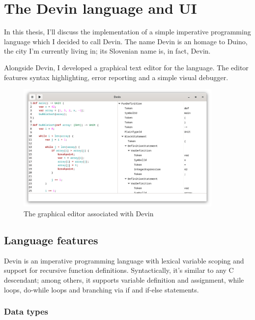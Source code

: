 \documentclass[UdineBachThesis,american,11pt]{PhdThesis}
\begin{document}
  \newpage
  \thispagestyle{empty}

  \chapter{The Devin language and UI}

  In this thesis, I'll discuss the implementation of a simple imperative
  programming language which I decided to call Devin. The name Devin is an
  homage to Duino, the city I'm currently living in; its Slovenian name is, in
  fact, Devin.

  Alongside Devin, I developed a graphical text editor for the language. The
  editor features syntax highlighting, error reporting and a simple visual
  debugger.

  \begin{figure}[H]
    \centering
    \includegraphics[width=0.9\textwidth]{2.png}
    \caption{The graphical editor associated with Devin}
  \end{figure}

  \section{Language features}

  Devin is an imperative programming language with lexical variable scoping and
  support for recursive function definitions. Syntactically, it's similar to any
  C descendant; among others, it supports variable definition and assignment,
  while loops, do-while loops and branching via if and if-else statements.

  \subsection{Data types}
\end{document}
